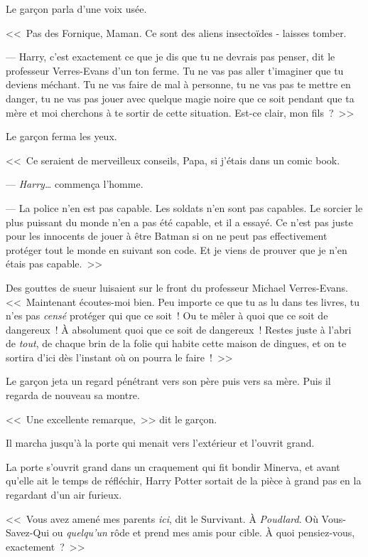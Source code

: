 Le garçon parla d'une voix usée.

<<~Pas des Fornique, Maman. Ce sont des aliens insectoïdes - laisses tomber.

--- Harry, c'est exactement ce que je dis que tu ne devrais pas penser, dit le professeur Verres-Evans d'un ton ferme. Tu ne vas pas aller t'imaginer que tu deviens méchant. Tu ne vas faire de mal à personne, tu ne vas pas te mettre en danger, tu ne vas pas jouer avec quelque magie noire que ce soit pendant que ta mère et moi cherchons à te sortir de cette situation. Est-ce clair, mon fils~?~>>

Le garçon ferma les yeux.

<<~Ce seraient de merveilleux conseils, Papa, si j'étais dans un comic book.

--- \emph{Harry…} commença l'homme.

--- La police n'en est pas capable. Les soldats n'en sont pas capables. Le sorcier le plus puissant du monde n'en a pas été capable, et il a essayé. Ce n'est pas juste pour les innocents de jouer à être Batman si on ne peut pas effectivement protéger tout le monde en suivant son code. Et je viens de prouver que je n'en étais pas capable.~>>

Des gouttes de sueur luisaient sur le front du professeur Michael Verres-Evans. <<~Maintenant écoutes-moi bien. Peu importe ce que tu as lu dans tes livres, tu n'es pas \emph{censé} protéger qui que ce soit~! Ou te mêler à quoi que ce soit de dangereux~! À absolument quoi que ce soit de dangereux~! Restes juste à l'abri de \emph{tout}, de chaque brin de la folie qui habite cette maison de dingues, et on te sortira d'ici dès l'instant où on pourra le faire~!~>>

Le garçon jeta un regard pénétrant vers son père puis vers sa mère. Puis il regarda de nouveau sa montre.

<<~Une excellente remarque,~>> dit le garçon.

Il marcha jusqu'à la porte qui menait vers l'extérieur et l'ouvrit grand.

\later

La porte s'ouvrit grand dans un craquement qui fit bondir Minerva, et avant qu'elle ait le temps de réfléchir, Harry Potter sortait de la pièce à grand pas en la regardant d'un air furieux.

<<~Vous avez amené mes parents \emph{ici}, dit le Survivant. À \emph{Poudlard}. Où Vous-Savez-Qui ou \emph{quelqu'un} rôde et prend mes amis pour cible. À quoi pensiez-vous, exactement~?~>>


